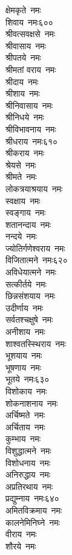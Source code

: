 \begin{multicols}{\maxColumns}
\begin{flushleft}
क्षेमकृते~नमः\\
शिवाय~नमः\hfill ६००\\
श्रीवत्सवक्षसे~नमः\\
श्रीवासाय~नमः\\
श्रीपतये~नमः\\
श्रीमतां वराय~नमः\\
श्रीदाय~नमः\\
श्रीशाय~नमः\\
श्रीनिवासाय~नमः\\
श्रीनिधये~नमः\\
श्रीविभावनाय~नमः\\
श्रीधराय~नमः\hfill ६१०\\
श्रीकराय~नमः\\
श्रेयसे~नमः\\
श्रीमते~नमः\\
लोकत्रयाश्रयाय~नमः\\
स्वक्षाय~नमः\\
स्वङ्गाय~नमः\\
शतानन्दाय~नमः\\
नन्दये~नमः\\
ज्योतिर्गणेश्वराय~नमः\\
विजितात्मने~नमः\hfill ६२०\\
अविधेयात्मने~नमः\\
सत्कीर्तये~नमः\\
छिन्नसंशयाय~नमः\\
उदीर्णाय~नमः\\
सर्वतश्चक्षुषे~नमः\\
अनीशाय~नमः\\
शाश्वतस्स्थिराय~नमः\\
भूशयाय~नमः\\
भूषणाय~नमः\\
भूतये~नमः\hfill ६३०\\
विशोकाय~नमः\\
शोकनाशनाय~नमः\\
अर्चिष्मते~नमः\\
अर्चिताय~नमः\\
कुम्भाय~नमः\\
विशुद्धात्मने~नमः\\
विशोधनाय~नमः\\
अनिरुद्धाय~नमः\\
अप्रतिरथाय~नमः\\
प्रद्युम्नाय~नमः\hfill ६४०\\
अमितविक्रमाय~नमः\\
कालनेमिनिघ्ने~नमः\\
वीराय~नमः\\
शौरये~नमः\\

\end{flushleft}
\end{multicols}
